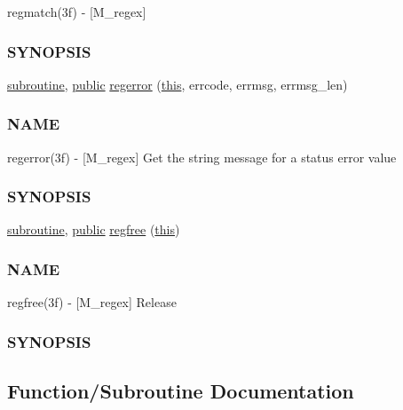 \begin{DoxyCompactItemize}
\begin{DoxyCompactList}
regmatch(3f) -\/ \mbox{[}M\+\_\+regex\mbox{]} \subsubsection*{S\+Y\+N\+O\+P\+S\+IS}\end{DoxyCompactList}\item 
\hyperlink{M__stopwatch_83_8txt_acfbcff50169d691ff02d4a123ed70482}{subroutine}, \hyperlink{M__stopwatch_83_8txt_a2f74811300c361e53b430611a7d1769f}{public} \hyperlink{namespacem__regex_a7fe6dc1737cbfdf0bb8e1ddca2055a33}{regerror} (\hyperlink{M__stopwatch_83_8txt_ad62a52042bb610eee5b36b5516caec22}{this}, errcode, errmsg, errmsg\+\_\+len)
\begin{DoxyCompactList}\small\item\em \subsubsection*{N\+A\+ME}

regerror(3f) -\/ \mbox{[}M\+\_\+regex\mbox{]} Get the string message for a status error value \subsubsection*{S\+Y\+N\+O\+P\+S\+IS}\end{DoxyCompactList}\item 
\hyperlink{M__stopwatch_83_8txt_acfbcff50169d691ff02d4a123ed70482}{subroutine}, \hyperlink{M__stopwatch_83_8txt_a2f74811300c361e53b430611a7d1769f}{public} \hyperlink{namespacem__regex_a4e4e0028bd3eddc7b2444e90a2129b9e}{regfree} (\hyperlink{M__stopwatch_83_8txt_ad62a52042bb610eee5b36b5516caec22}{this})
\begin{DoxyCompactList}\small\item\em \subsubsection*{N\+A\+ME}

regfree(3f) -\/ \mbox{[}M\+\_\+regex\mbox{]} Release \subsubsection*{S\+Y\+N\+O\+P\+S\+IS}\end{DoxyCompactList}\end{DoxyCompactItemize}


\subsection{Function/\+Subroutine Documentation}
\mbox{\label{namespacem__regex_ac4e468cb031565f4f4744d8f4c9eee91}} 
